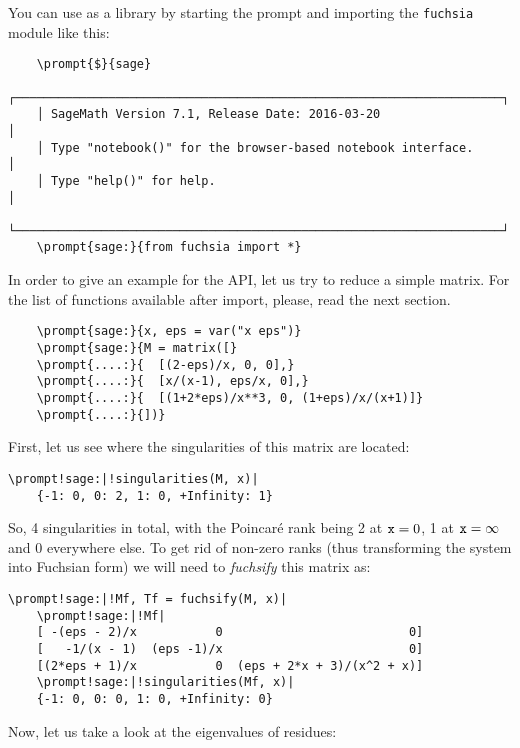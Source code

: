 \documentclass[12pt,a4paper]{article}
\begin{document}
You can use \fuchsia as a library by starting the \sage prompt and importing the \texttt{fuchsia} module like this:

\begin{Verbatim}
    \prompt{$}{sage}
    ┌────────────────────────────────────────────────────────────────────┐
    │ SageMath Version 7.1, Release Date: 2016-03-20                     │
    │ Type "notebook()" for the browser-based notebook interface.        │
    │ Type "help()" for help.                                            │
    └────────────────────────────────────────────────────────────────────┘
    \prompt{sage:}{from fuchsia import *}
\end{Verbatim}

In order to give an example for the API, let us try to reduce a simple matrix.
For the list of functions available after import, please, read the next section.

\begin{Verbatim}
    \prompt{sage:}{x, eps = var("x eps")}
    \prompt{sage:}{M = matrix([}
    \prompt{....:}{  [(2-eps)/x, 0, 0],}
    \prompt{....:}{  [x/(x-1), eps/x, 0],}
    \prompt{....:}{  [(1+2*eps)/x**3, 0, (1+eps)/x/(x+1)]}
    \prompt{....:}{])}
\end{Verbatim}

First, let us see where the singularities of this matrix are located:

\begin{Verbatim}[commandchars=\\!|]
    \prompt!sage:|!singularities(M, x)|
    {-1: 0, 0: 2, 1: 0, +Infinity: 1}
\end{Verbatim}

So, 4 singularities in total, with the Poincar\'e rank being 2 at $\texttt{x}=0$, 1 at $\texttt{x}=\infty$ and 0 everywhere else.
To get rid of non-zero ranks (thus transforming the system into Fuchsian form) we will need to \textit{fuchsify} this matrix as:

\begin{Verbatim}[commandchars=\\!|]
    \prompt!sage:|!Mf, Tf = fuchsify(M, x)|
    \prompt!sage:|!Mf|
    [ -(eps - 2)/x           0                          0]
    [   -1/(x - 1)  (eps -1)/x                          0]
    [(2*eps + 1)/x           0  (eps + 2*x + 3)/(x^2 + x)]
    \prompt!sage:|!singularities(Mf, x)|
    {-1: 0, 0: 0, 1: 0, +Infinity: 0}
\end{Verbatim}

Now, let us take a look at the eigenvalues of  residues:
\end{document}
